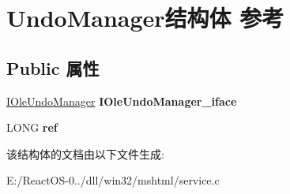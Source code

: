 \hypertarget{struct_undo_manager}{}\section{Undo\+Manager结构体 参考}
\label{struct_undo_manager}
\subsection*{Public 属性}
\begin{DoxyCompactItemize}
\item 
\mbox{\label{struct_undo_manager_a434a2ebca50cdb0060c9ae5e39bd5dd1}} 
\hyperlink{interface_i_ole_undo_manager}{I\+Ole\+Undo\+Manager} {\bfseries I\+Ole\+Undo\+Manager\+\_\+iface}
\item 
\mbox{\label{struct_undo_manager_a6e83a7d84bbfc0d53d4db5ac921c18bb}} 
L\+O\+NG {\bfseries ref}
\end{DoxyCompactItemize}


该结构体的文档由以下文件生成\+:\begin{DoxyCompactItemize}
\item 
E\+:/\+React\+O\+S-\/0../dll/win32/mshtml/service.\+c\end{DoxyCompactItemize}
